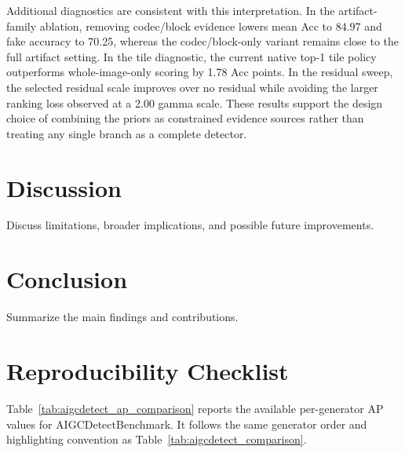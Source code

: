 \documentclass[lettersize,journal]{IEEEtran}
\begin{document}
Additional diagnostics are consistent with this interpretation. In the artifact-family ablation, removing codec/block evidence lowers mean Acc to 84.97 and fake accuracy to 70.25, whereas the codec/block-only variant remains close to the full artifact setting. In the tile diagnostic, the current native top-1 tile policy outperforms whole-image-only scoring by 1.78 Acc points. In the residual sweep, the selected residual scale improves over no residual while avoiding the larger ranking loss observed at a 2.00 gamma scale. These results support the design choice of combining the priors as constrained evidence sources rather than treating any single branch as a complete detector.

\section{Discussion}
\label{sec:discussion}
Discuss limitations, broader implications, and possible future improvements.

\section{Conclusion}
\label{sec:conclusion}
Summarize the main findings and contributions.




\clearpage
\section*{Reproducibility Checklist}

Table~\ref{tab:aigcdetect_ap_comparison} reports the available per-generator AP values for AIGCDetectBenchmark. It follows the same generator order and highlighting convention as Table~\ref{tab:aigcdetect_comparison}.
\end{document}
